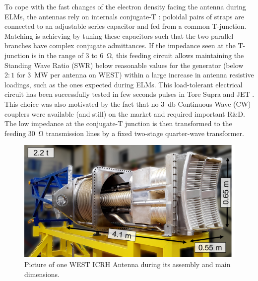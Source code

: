 \documentclass[12p]{iopart}
\begin{document}
To cope with the fast changes of the electron density facing the antenna during ELMs, the antennas rely on internals conjugate-T \cite{bosia2003-1}: poloidal pairs of straps are connected to an adjustable series capacitor and fed from a common T-junction. Matching is achieving by tuning these capacitors such that the two parallel branches have complex conjugate admittances. If the impedance seen at the T-junction is in the range of 3 to \SI{6}{\ohm}, this feeding circuit allows maintaining the Standing Wave Ratio (SWR) below reasonable values for the generator (below $2{:}1$ for \SI{3}{\mega\watt} per antenna on WEST) within a large increase in antenna resistive loadings, such as the ones expected during ELMs. This load-tolerant electrical circuit has been successfully tested in few seconds pulses in Tore Supra \cite{vulliez2008} and JET \cite{durodie2012-1}. This choice was also motivated by the fact that no \SI{3}{\decibel} Continuous Wave (CW) couplers were available (and still) on the market and required important R\&D. The low impedance at the conjugate-T junction is then transformed to the feeding \SI{30}{\ohm} transmission lines by a fixed two-stage quarter-wave transformer.


\begin{figure}
	\centering
	\includegraphics[width=0.95\linewidth]{figures/antenna}
	\caption{Picture of one WEST ICRH Antenna during its assembly and main dimensions.}
	\label{fig:antenna}
\end{figure}
\end{document}
